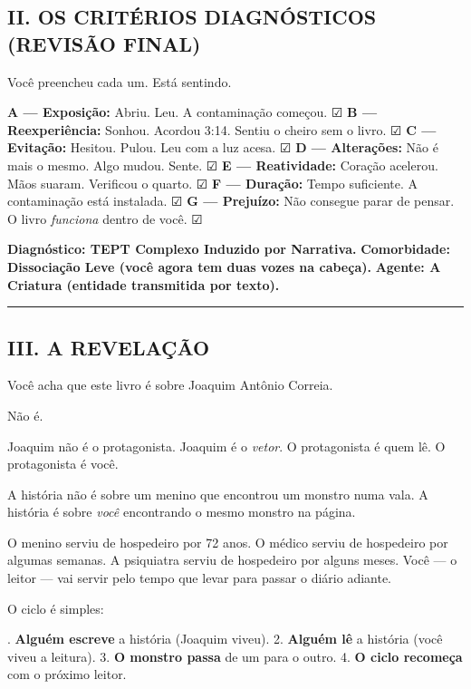 \subsection*{II. OS CRITÉRIOS DIAGNÓSTICOS (REVISÃO FINAL)}

\noindent Você preencheu cada um. Está sentindo.

\noindent \textbf{A --- Exposição:} Abriu. Leu. A contaminação começou. ☑
\textbf{B --- Reexperiência:} Sonhou. Acordou 3:14. Sentiu o cheiro sem o livro. ☑
\textbf{C --- Evitação:} Hesitou. Pulou. Leu com a luz acesa. ☑
\textbf{D --- Alterações:} Não é mais o mesmo. Algo mudou. Sente. ☑
\textbf{E --- Reatividade:} Coração acelerou. Mãos suaram. Verificou o quarto. ☑
\textbf{F --- Duração:} Tempo suficiente. A contaminação está instalada. ☑
\textbf{G --- Prejuízo:} Não consegue parar de pensar. O livro \textit{funciona} dentro de você. ☑

\noindent \textbf{Diagnóstico: TEPT Complexo Induzido por Narrativa.}
\textbf{Comorbidade: Dissociação Leve (você agora tem duas vozes na cabeça).}
\textbf{Agente: A Criatura (entidade transmitida por texto).}

\vspace{0.5em}\noindent\rule{\textwidth}{0.5pt}\vspace{0.5em}

\subsection*{III. A REVELAÇÃO}

\noindent Você acha que este livro é sobre Joaquim Antônio Correia.

\noindent Não é.

\noindent Joaquim não é o protagonista.
Joaquim é o \textit{vetor}.
O protagonista é quem lê.
O protagonista é você.

\noindent A história não é sobre um menino que encontrou um monstro numa vala.
A história é sobre \textit{você} encontrando o mesmo monstro na página.

\noindent O menino serviu de hospedeiro por 72 anos.
O médico serviu de hospedeiro por algumas semanas.
A psiquiatra serviu de hospedeiro por alguns meses.
Você --- o leitor --- vai servir pelo tempo que levar para passar o diário adiante.

\noindent O ciclo é simples:

. \textbf{Alguém escreve} a história (Joaquim viveu).
2. \textbf{Alguém lê} a história (você viveu a leitura).
3. \textbf{O monstro passa} de um para o outro.
4. \textbf{O ciclo recomeça} com o próximo leitor.

